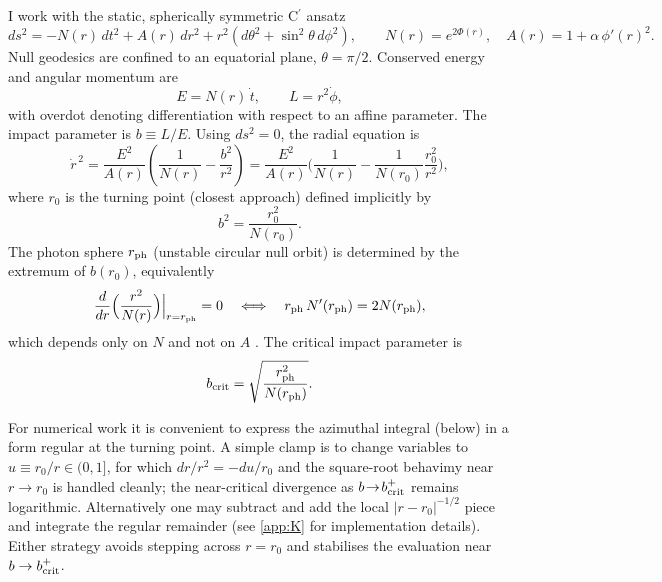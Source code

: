 \documentclass{iopjournal}
\begin{document}
I work with the static, spherically symmetric C$^\prime$ ansatz
\begin{equation}
ds^2=-N(r)\,dt^2+A(r)\,dr^2+r^2(d\theta^2+\sin^2\theta\,d\phi^2),
\qquad N(r)=e^{2\Phi(r)},\quad A(r)=1+\alpha\,\phi'(r)^{2}.
\label{eq:D_metric}
\end{equation}
Null geodesics are confined to an equatorial plane, $\theta=\pi/2$. Conserved energy and angular momentum are
\begin{equation}
E=N(r)\,\dot t,\qquad L=r^2\dot\phi,
\label{eq:D_EL}
\end{equation}
with overdot denoting differentiation with respect to an affine parameter. The impact parameter is $b\equiv L/E$. Using $ds^2=0$, the radial equation is
\begin{equation}
\dot r^{\,2}=\frac{E^2}{A(r)}\left(\frac{1}{N(r)}-\frac{b^2}{r^2}\right)
=\frac{E^2}{A(r)}\bigg(\frac{1}{N(r)}-\frac{1}{N(r_0)}\frac{r_0^2}{r^2}\bigg),
\label{eq:D_rdot}
\end{equation}
where $r_0$ is the turning point (closest approach) defined implicitly by
\begin{equation}
b^2=\frac{r_0^2}{N(r_0)}.
\label{eq:D_b_of_r0}
\end{equation}
The photon sphere $r_{\rm ph}$ (unstable circular null orbit) is determined by the extremum of $b(r_0)$, equivalently
\begin{equation}
\frac{d}{dr}\Big(\frac{r^2}{N(r)}\Big)\Big|_{r=r_{\rm ph}}=0
\quad\Longleftrightarrow\quad
r_{\rm ph}\,N'(r_{\rm ph})=2N(r_{\rm ph}),
\label{eq:D_photonsphere}
\end{equation}
which depends only on $N$ and not on $A$ \cite{ClaudelVirbhadraEllis2001,Perlick2004LRR}. The critical impact parameter is
\begin{equation}
b_{\rm crit}=\sqrt{\frac{r_{\rm ph}^2}{N(r_{\rm ph})}}.
\label{eq:D_bcrit}
\end{equation}

For numerical work it is convenient to express the azimuthal integral (below) in a form regular at the turning point. A simple clamp is to change variables to $u\equiv r_0/r\in(0,1]$, for which $dr/r^2=-du/r_0$ and the square-root behavimy near $r\!\to\!r_0$ is handled cleanly; the near-critical divergence as $b\!\to\!b_{\rm crit}^+$ remains logarithmic. Alternatively one may subtract and add the local $|r-r_0|^{-1/2}$ piece and integrate the regular remainder (see \cref{app:K} for implementation details). Either strategy avoids stepping across $r=r_0$ and stabilises the evaluation near $b\to b_{\rm crit}^+$.
\end{document}
